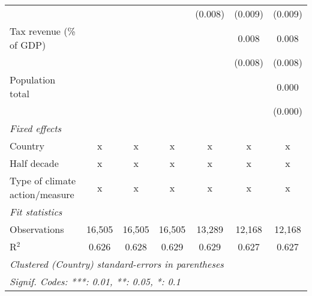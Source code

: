 \begin{tabular}{lcccccc}
                                                        &         &               &               & (0.008)        & (0.009)        & (0.009)\\   
   Tax revenue (\% of GDP)                              &         &               &               &                & 0.008          & 0.008\\   
                                                        &         &               &               &                & (0.008)        & (0.008)\\   
   Population total                                     &         &               &               &                &                & 0.000\\   
                                                        &         &               &               &                &                & (0.000)\\   
   \emph{Fixed effects}\\
   Country                                              & x       & x             & x             & x              & x              & x\\  
   Half decade                                          & x       & x             & x             & x              & x              & x\\  
   Type of climate action/measure                       & x       & x             & x             & x              & x              & x\\  
   \midrule \emph{Fit statistics}\\
   Observations                                         & 16,505  & 16,505        & 16,505        & 13,289         & 12,168         & 12,168\\  
   R$^2$                                                & 0.626   & 0.628         & 0.629         & 0.629          & 0.627          & 0.627\\  
   \midrule
   \multicolumn{7}{l}{\emph{Clustered (Country) standard-errors in parentheses}}\\
   \multicolumn{7}{l}{\emph{Signif. Codes: ***: 0.01, **: 0.05, *: 0.1}}\\
\end{tabular}
\par\endgroup


